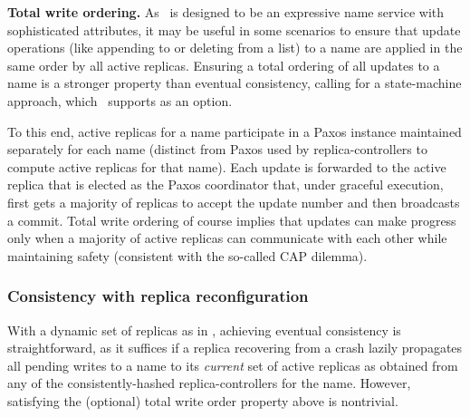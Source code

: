 
\textbf{Total write ordering.} As \auspice\ is designed to be an expressive name service with sophisticated attributes, it may be useful in some scenarios to ensure that update operations (like appending to or deleting from a list) to a name are applied in the same order by all active replicas. Ensuring a total ordering of all updates to a name is a stronger property than eventual consistency, calling for a state-machine approach, which \auspice\ supports as an option.

To this end, active replicas for a name participate in a Paxos instance maintained separately for each name (distinct from Paxos used by replica-controllers to compute active replicas for that name). Each update is forwarded to the active replica that is elected as the Paxos coordinator that, under graceful execution, first gets a majority of replicas to accept the update number and then broadcasts a commit. Total write ordering of course implies that updates can make progress  only when a majority of active replicas can communicate with each other while maintaining safety (consistent with the so-called CAP dilemma).



\vsp
\subsubsection{Consistency with replica reconfiguration}
\label{sec:reconfiguration}

With a dynamic set of replicas as in \auspice, achieving eventual consistency is straightforward, as it suffices if a replica recovering from a crash lazily propagates all pending writes to a name to its {\em current} set of active replicas as obtained from any of the consistently-hashed replica-controllers for the name. However, satisfying the (optional) total write order property above is nontrivial.

